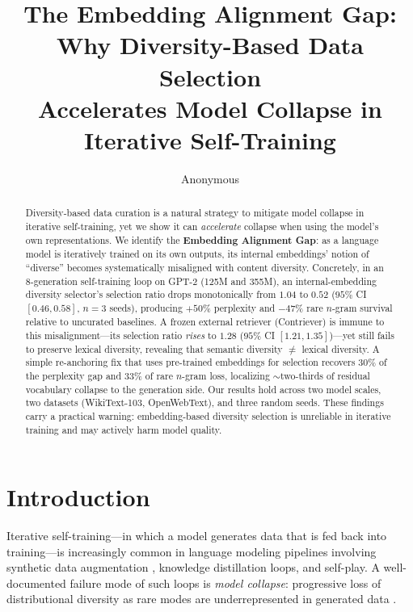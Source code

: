 \documentclass[11pt,a4paper]{article}
\title{The Embedding Alignment Gap: Why Diversity-Based Data Selection\\Accelerates Model Collapse in Iterative Self-Training}
\author{Anonymous}
\begin{document}
\maketitle

\begin{abstract}
Diversity-based data curation is a natural strategy to mitigate model collapse in iterative self-training, yet we show it can \emph{accelerate} collapse when using the model's own representations.
We identify the \textbf{Embedding Alignment Gap}: as a language model is iteratively trained on its own outputs, its internal embeddings' notion of ``diverse'' becomes systematically misaligned with content diversity.
Concretely, in an 8-generation self-training loop on GPT-2 (125M and 355M), an internal-embedding diversity selector's selection ratio drops monotonically from $1.04$ to $0.52$ ($95\%$ CI $[0.46, 0.58]$, $n{=}3$ seeds), producing $+50\%$ perplexity and $-47\%$ rare $n$-gram survival relative to uncurated baselines.
A frozen external retriever (Contriever) is immune to this misalignment---its selection ratio \emph{rises} to $1.28$ ($95\%$ CI $[1.21, 1.35]$)---yet still fails to preserve lexical diversity, revealing that semantic diversity $\neq$ lexical diversity.
A simple re-anchoring fix that uses pre-trained embeddings for selection recovers $30\%$ of the perplexity gap and $33\%$ of rare $n$-gram loss, localizing $\sim$two-thirds of residual vocabulary collapse to the generation side.
Our results hold across two model scales, two datasets (WikiText-103, OpenWebText), and three random seeds.
These findings carry a practical warning: embedding-based diversity selection is unreliable in iterative training and may actively harm model quality.
\end{abstract}

\section{Introduction}
\label{sec:intro}

Iterative self-training---in which a model generates data that is fed back into training---is increasingly common in language modeling pipelines involving synthetic data augmentation \cite{shumailov2024nature}, knowledge distillation loops, and self-play.
A well-documented failure mode of such loops is \emph{model collapse}: progressive loss of distributional diversity as rare modes are underrepresented in generated data \cite{shumailov2024nature,alemohammad2024selfconsuming,dohmatob2024tale}.
\end{document}
